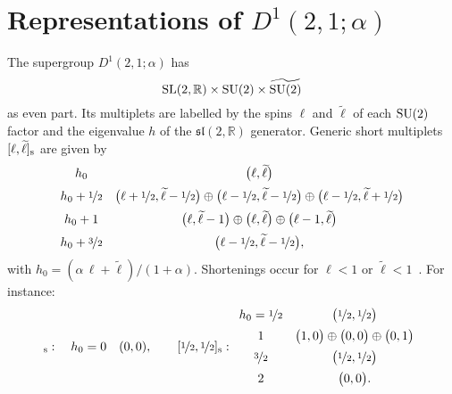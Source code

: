 \documentclass[a4paper, 11pt]{article}
\numberwithin{equation}{section}
\newcommand{\ts}[1]{\widetilde{#1}}
\newcommand{\+}{\oplus}
\begin{document}
\appendix

\section{Representations of \texorpdfstring{$D^{1}(2,1;\alpha)$}{D(2,1,a)}} \label{app:d21a}
The supergroup $D^{1}(2,1;\alpha)$ has
\begin{equation}
	{\rm SL}(2,\mathbb{R})\times{\rm SU}(2)\times\ts{{\rm SU}(2)}
\end{equation}
as even part. Its multiplets are labelled by the spins $\ell$ and $\ts{\ell}$ of each ${\rm SU}(2)$ factor and the eigenvalue $h$ of the $\mathfrak{sl}(2,\mathbb{R})$ generator. Generic short multiplets $[\ell,\ts{\ell}]_{\rm s}$ are given by~\cite{deBoer:1999gea,Eberhardt:2017fsi}
\begin{equation}
	\begin{array}{cc}
	 h_{0} & \big(\ell,\ts{\ell}\big) \\[5pt]
	 h_{0} + \nicefrac{1}{2} & \big(\ell+\nicefrac{1}{2},\ts{\ell}-\nicefrac{1}{2}\big) \oplus \big(\ell-\nicefrac{1}{2},\ts{\ell}-\nicefrac{1}{2}\big) \oplus \big(\ell-\nicefrac{1}{2},\ts{\ell}+\nicefrac{1}{2}\big) \\[5pt]
	 h_{0}+1 & \big(\ell,\ts{\ell}-1\big) \oplus \big(\ell,\ts{\ell}\big) \oplus \big(\ell-1,\ts{\ell}\big) \\[5pt]
	 h_{0} + \nicefrac{3}{2} & \big(\ell-\nicefrac{1}{2},\ts{\ell}-\nicefrac{1}{2}\big),
	\end{array}
\end{equation}
with $h_{0}=(\alpha\,\ell+\ts{\ell})/(1+\alpha)$. Shortenings occur for $\ell<1$ or $\ts{\ell}<1$~\cite{deBoer:1999gea}. For instance:
\begin{equation}
	[0,0]_{\rm s}:\quad h_{0}=0 \quad (0,0),\qquad  [\nicefrac{1}{2},\nicefrac{1}{2}]_{\rm s}: \begin{array}{cc}
	 h_{0}=\nicefrac{1}{2} & \big(\nicefrac{1}{2},\nicefrac{1}{2}\big) \\[5pt]
	 1 & \big(1,0\big) \oplus \big(0,0\big) \oplus \big(0,1\big) \\[5pt]
	 \nicefrac{3}{2} & \big(\nicefrac{1}{2},\nicefrac{1}{2}\big) \\[5pt]
	 2 & \big(0,0\big).
	\end{array}
\end{equation}
\end{document}
